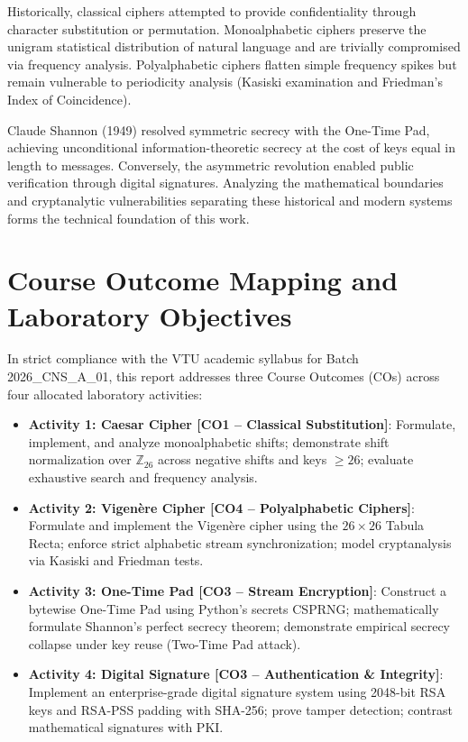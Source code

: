 \documentclass[12pt,a4paper]{report}
\renewcommand{\texttt}[1]{{\normalfont #1}}
\begin{document}
Historically, classical ciphers attempted to provide confidentiality through character substitution or permutation. Monoalphabetic ciphers preserve the unigram statistical distribution of natural language and are trivially compromised via frequency analysis. Polyalphabetic ciphers flatten simple frequency spikes but remain vulnerable to periodicity analysis (Kasiski examination and Friedman's Index of Coincidence). 

Claude Shannon (1949) resolved symmetric secrecy with the One-Time Pad, achieving unconditional information-theoretic secrecy at the cost of keys equal in length to messages. Conversely, the asymmetric revolution enabled public verification through digital signatures. Analyzing the mathematical boundaries and cryptanalytic vulnerabilities separating these historical and modern systems forms the technical foundation of this work.

\section{Course Outcome Mapping and Laboratory Objectives}
In strict compliance with the VTU academic syllabus for Batch 2026\_CNS\_A\_01, this report addresses three Course Outcomes (COs) across four allocated laboratory activities:
\begin{itemize}[noitemsep,topsep=2pt]
    \item \textbf{Activity 1: Caesar Cipher [CO1 -- Classical Substitution]}: Formulate, implement, and analyze monoalphabetic shifts; demonstrate shift normalization over $\mathbb{Z}_{26}$ across negative shifts and keys $\ge 26$; evaluate exhaustive search and frequency analysis.
    \item \textbf{Activity 2: Vigen\`ere Cipher [CO4 -- Polyalphabetic Ciphers]}: Formulate and implement the Vigen\`ere cipher using the $26 \times 26$ Tabula Recta; enforce strict alphabetic stream synchronization; model cryptanalysis via Kasiski and Friedman tests.
    \item \textbf{Activity 3: One-Time Pad [CO3 -- Stream Encryption]}: Construct a bytewise One-Time Pad using Python's \texttt{secrets} CSPRNG; mathematically formulate Shannon's perfect secrecy theorem; demonstrate empirical secrecy collapse under key reuse (Two-Time Pad attack).
    \item \textbf{Activity 4: Digital Signature [CO3 -- Authentication \& Integrity]}: Implement an enterprise-grade digital signature system using 2048-bit RSA keys and RSA-PSS padding with SHA-256; prove tamper detection; contrast mathematical signatures with PKI.
\end{itemize}
\end{document}

